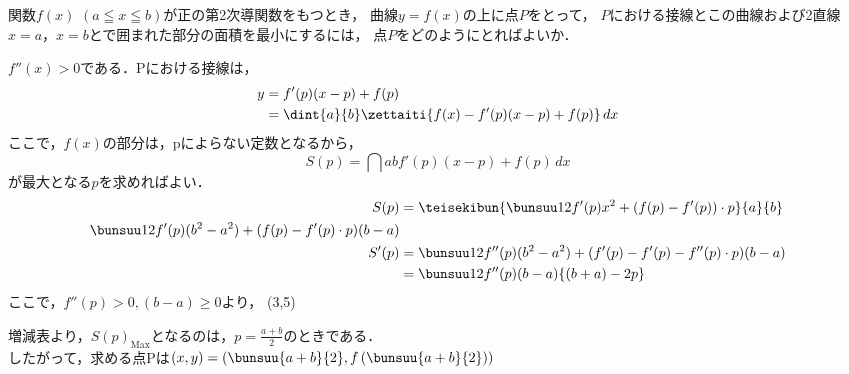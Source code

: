 \begin{problem}
関数$f(x)$ $(a \leqq x \leqq b)$が正の第2次導関数をもつとき，
曲線$y=f(x)$の上に点$P$をとって，
$P$における接線とこの曲線および2直線$x=a$，$x=b$とで囲まれた部分の面積を最小にするには，
点$P$をどのようにとればよいか．
\end{problem}

$f''(x) > 0$である．Pにおける接線は，
\begin{align*}
  y &= f'(p) (x-p) + f(p) \\
  &= \dint{a}{b}\zettaiti{f(x) - f'(p)(x-p) + f(p)}\,dx
\end{align*}
ここで，$f(x)$の部分は，pによらない定数となるから，
\[S(p) = \dint{a}{b}f'(p)(x-p)+f(p)\,dx\]
が最大となる$p$を求めればよい．
\begin{align*}
  S(p) &=
  \teisekibun{\bunsuu12 f'(p)x^2 + (f(p)-f'(p))\cdot p}{a}{b}\\
  \bunsuu12 f'(p)(b^2-a^2) + (f(p)-f'(p)\cdot p)(b-a)\\
  S'(p) &= \bunsuu12 f''(p)(b^2-a^2)+(f'(p)-f'(p)-f''(p)\cdot p)(b-a) \\
  &= \bunsuu12 f''(p) (b-a)\{(b+a)-2p\}
\end{align*}
ここで，$f''(p) > 0, (b-a) \geq 0$より，
\RESETKEYA
{}
\zogen(3,5)

増減表より，$S(p)_{\mathrm{Max}}$となるのは，$p = \frac{a+b}{2}$のときである．\\したがって，求める点Pは$(x,y) =\left(\bunsuu{a+b}{2},f\left(\bunsuu{a+b}{2}\right)\right)$
